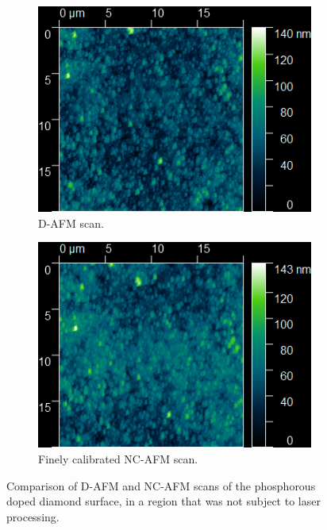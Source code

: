 \begin{refsection}
\begin{figure}[H]
    \centering
    \begin{subfigure}[b]{0.49\textwidth}
        \centering
        \includegraphics[width=\textwidth]{Chapter7/Figs/Raster/DAFM/forward DFM 55 drive 2 z 256 04 Hz.png}
        \caption{D-AFM scan.}
        \label{fig:dafm}
    \end{subfigure}
    \hfill
    \begin{subfigure}[b]{0.49\textwidth}
        \centering
        \includegraphics[width=\textwidth]{Chapter7/Figs/Raster/DAFM/forward NC-AFM 100 drive 1 z 256 05 Hz.png}
        \caption{Finely calibrated NC-AFM scan.}
        \label{fig:ncafm}
    \end{subfigure}
    \caption{Comparison of D-AFM and NC-AFM scans of the phosphorous doped diamond surface, in a region that was not subject to laser processing.}
\end{figure}


\end{refsection}
